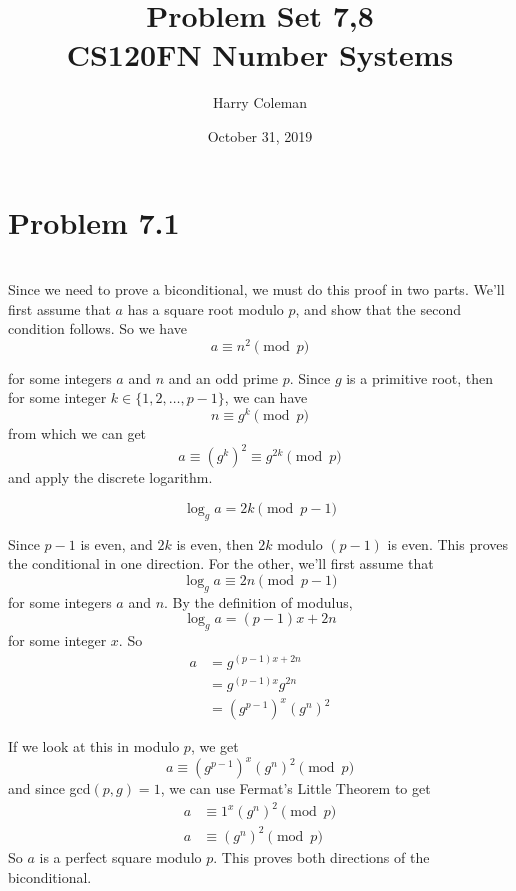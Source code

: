 \documentclass[12pt]{article}
\begin{document}
 
\title{Problem Set 7,8\\
    \large CS120FN Number Systems}
\author{Harry Coleman}
\date{October 31, 2019}

\maketitle

\section*{Problem 7.1}
\\

Since we need to prove a biconditional, we must do this proof in two parts. We'll first assume that $a$ has a square root modulo $p$, and show that the second condition follows. So we have
\[a \equiv n^2 \pmod{p}\]

for some integers $a$ and $n$ and an odd prime $p$. Since $g$ is a primitive root, then for some integer $k \in \{1,2,\dots,p-1\}$, we can have
\[n \equiv g^k \pmod{p}\]
from which we can get
\[a \equiv (g^k)^2 \equiv g^{2k} \pmod{p}\]
and apply the discrete logarithm.

\[\log_g a = 2k \pmod{p-1}\]

Since $p-1$ is even, and $2k$ is even, then $2k$ modulo $(p-1)$ is even. This proves the conditional in one direction. For the other, we'll first assume that 
\[\log_g a \equiv 2n \pmod{p-1}\]
for some integers $a$ and $n$. By the definition of modulus,
\[\log_g a = (p-1)x + 2n\]
for some integer $x$. So
\begin{align*}
    a &= g^{(p-1)x + 2n} \\
      &= g^{(p-1)x}g^{2n} \\
      &= (g^{p-1})^x(g^n)^2
\end{align*}

If we look at this in modulo $p$, we get
\[a \equiv (g^{p-1})^x(g^n)^2 \pmod{p}\]
and since gcd$(p,g) = 1$, we can use Fermat's Little Theorem to get
\begin{align*}
    a &\equiv 1^x(g^n)^2 \pmod{p} \\
    a &\equiv (g^n)^2 \pmod{p}
\end{align*}
So $a$ is a perfect square modulo $p$. This proves both directions of the biconditional.
\end{document}
